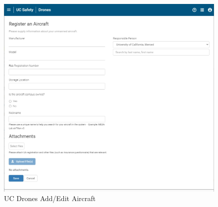 \documentclass[
]{book}
\begin{document}
\begin{figure}

{\centering \includegraphics[width=0.95\linewidth]{images/UCDrones_aircraft} 

}

\caption{UC Drones Add/Edit Aircraft}\label{fig:UCDrones-edit-aircrafts}
\end{figure}
\end{document}
